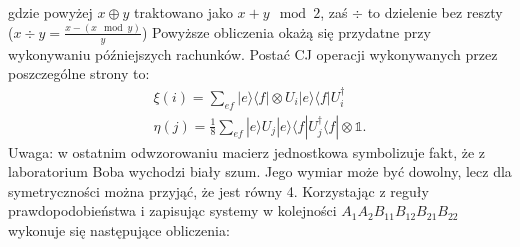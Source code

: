 \documentclass[10pt]{article} %
\newcommand{\Ket}[1]{|#1\rangle}
\newcommand{\Bra}[1]{\langle#1|}
\newcommand{\I}{\mathbb{1}}
\begin{document}
gdzie powyżej $x \oplus y$ traktowano jako $x + y \mod 2$, zaś $\div$ to dzielenie bez reszty ($x \div y = \frac{x - (x \mod y)}{y}$) Powyższe obliczenia okażą się przydatne przy wykonywaniu późniejszych rachunków.
Postać CJ operacji wykonywanych przez poszczególne strony to:
\begin{gather}
\xi(i) = \sum_{ef} \Ket{e}\Bra{f} \otimes U_i \Ket{e}\Bra{f} U_i^\dag  \\
\eta(j) = \frac{1}{8}\sum_{ef}  \Ket{e} U_j \Ket{e}\Bra{f} U_j^\dag\Bra{f} \otimes \I.
\end{gather} Uwaga: w ostatnim odwzorowaniu macierz jednostkowa symbolizuje fakt, że z laboratorium Boba wychodzi biały szum. Jego wymiar może być dowolny, lecz dla symetryczności można przyjąć, że jest równy 4. Korzystając z reguły prawdopodobieństwa i zapisując systemy w kolejności $A_{1} A_2 B_{11} B_{12} B_{21} B_{22}$ wykonuje się następujące obliczenia:
\end{document}
